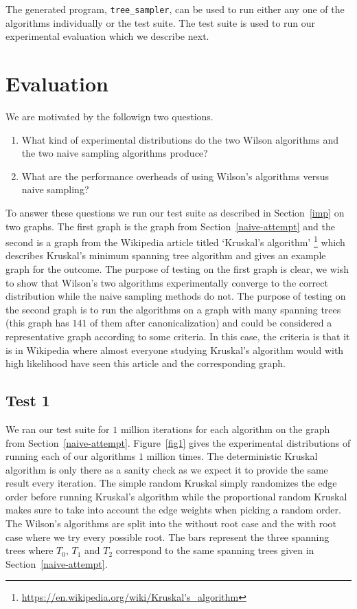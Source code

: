 \documentclass[11pt]{article}
\begin{document}
The generated program, \texttt{tree\_sampler}, can be used to run either any one of the algorithms individually or the test suite. The test suite is used to run our experimental evaluation which we describe next.

\section{Evaluation}\label{eval}

We are motivated by the followign two questions.

\begin{enumerate}[1.]
\item What kind of experimental distributions do the two Wilson algorithms and the two naive sampling algorithms produce?
\item What are the performance overheads of using Wilson's algorithms versus naive sampling?
\end{enumerate}

To answer these questions we run our test suite as described in Section~\ref{imp} on two graphs. The first graph is the graph from Section~\ref{naive-attempt} and the second is a graph from the Wikipedia article titled `Kruskal's algorithm' \footnote{\url{https://en.wikipedia.org/wiki/Kruskal's_algorithm}} which describes Kruskal's minimum spanning tree algorithm and gives an example graph for the outcome. The purpose of testing on the first graph is clear, we wish to show that Wilson's two algorithms experimentally converge to the correct distribution while the naive sampling methods do not. The purpose of testing on the second graph is to run the algorithms on a graph with many spanning trees (this graph has $141$ of them after canonicalization) and could be considered a representative graph according to some criteria. In this case, the criteria is that it is in Wikipedia where almost everyone studying Kruskal's algorithm would with high likelihood have seen this article and the corresponding graph.

\subsection{Test 1}

We ran our test suite for $1$ million iterations for each algorithm on the graph from Section~\ref{naive-attempt}. Figure~\ref{fig1} gives the experimental distributions of running each of our algorithms $1$ million times. The deterministic Kruskal algorithm is only there as a sanity check as we expect it to provide the same result every iteration. The simple random Kruskal simply randomizes the edge order before running Kruskal's algorithm while the proportional random Kruskal makes sure to take into account the edge weights when picking a random order. The Wilson's algorithms are split into the without root case and the with root case where we try every possible root. The bars represent the three spanning trees where $T_0$, $T_1$ and $T_2$ correspond to the same spanning trees given in Section~\ref{naive-attempt}.
\end{document}
